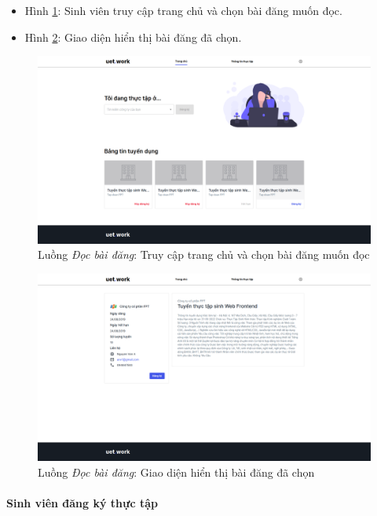 \documentclass[./../main.tex]{subfiles}
\begin{document}
\begin{itemize}
	\item Hình \ref{fig:student_home_page}: Sinh viên truy cập trang chủ và chọn bài đăng muốn đọc.
	\item Hình \ref{fig:student_read_post_page}: Giao diện hiển thị bài đăng đã chọn.
\end{itemize}

\begin{figure}[]
	\includegraphics[width=\linewidth]{./images/image37.png}
	\caption{Luồng \emph{Đọc bài đăng}: Truy cập trang chủ và chọn bài đăng muốn đọc}
	\label{fig:student_home_page}
\end{figure}

\begin{figure}[]
	\includegraphics[width=\linewidth]{./images/image81.png}
	\caption{Luồng \emph{Đọc bài đăng}: Giao diện hiển thị bài đăng đã chọn}
	\label{fig:student_read_post_page}
\end{figure}

\paragraph*{Sinh viên đăng ký thực tập}
\end{document}
